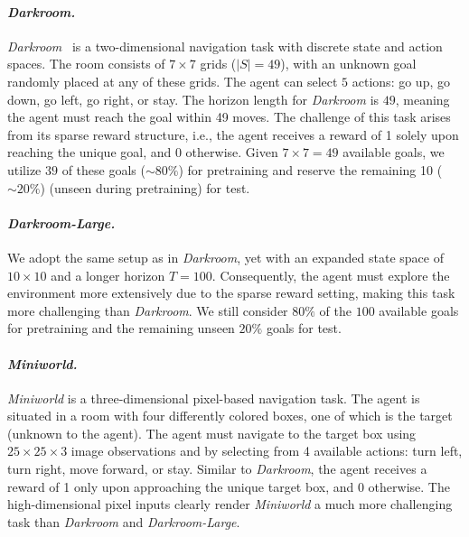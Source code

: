 \documentclass[10pt]{article}
\begin{document}
\paragraph{\textit{Darkroom.}}
\textit{Darkroom}~\citep{laskin2022context, zintgraf2019varibad} is a two-dimensional navigation task with discrete state and action spaces. The room consists of $7 \times 7$ grids ($|S| = 49$), with an unknown goal randomly placed at any of these grids. The agent can select $5$ actions: go up, go down, go left, go right, or stay. The horizon length for \textit{Darkroom} is $49$, meaning the agent must reach the goal within 49 moves. The challenge of this task arises from its sparse reward structure, i.e., the agent receives a reward of 1 solely upon reaching the unique goal, and $0$ otherwise.
Given $7 \times 7 = 49$ available goals, we utilize $39$ of these goals ($\sim 80\%$) for pretraining and reserve the remaining 10 ($\sim 20\%$) (unseen during pretraining) for test.
\paragraph{\textit{Darkroom-Large.}}
We adopt the same setup as in \textit{Darkroom}, yet with an expanded state space of $10 \times 10$ and a longer horizon $T=100$. Consequently, the agent must explore the environment more extensively due to the sparse reward setting, making this task more challenging than \textit{Darkroom}. We still consider $80\%$ of the $100$ available goals for pretraining and the remaining unseen $20\%$ goals for test.
\paragraph{\textit{Miniworld.}}
\textit{Miniworld} is a three-dimensional pixel-based navigation task. The agent is situated in a room with four differently colored boxes, one of which is the target (unknown to the agent). The agent must navigate to the target box using $25 \times 25 \times 3$ image observations and by selecting from 4 available actions: turn left, turn right, move forward, or stay. Similar to \textit{Darkroom}, the agent receives a reward of 1 only upon approaching the unique target box, and 0 otherwise. The high-dimensional pixel inputs clearly render \textit{Miniworld} a much more challenging task than \textit{Darkroom} and \textit{Darkroom-Large}.
\end{document}
